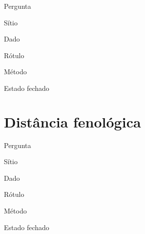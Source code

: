 \begin{ficha}
  \item[Pergunta] \lipsum[12][1]
  \item[Sítio]    \lipsum[13][2]
  \item[Dado]     \lipsum[14][3]
  \item[Rótulo]   \lipsum[15][1]
  \item[Método]   \lipsum[16][2]
  \item[Estado]   fechado
\end{ficha}

\lipsum[17][1-5]

\lipsum[18][1-4]

\conclusao{\lipsum[19][1-2]}

\begin{objecao}\lipsum[20][1-3]\end{objecao}


\section{Distância fenológica}

\begin{ficha}
  \item[Pergunta] \lipsum[21][1]
  \item[Sítio]    \lipsum[22][2]
  \item[Dado]     \lipsum[23][3]
  \item[Rótulo]   \lipsum[24][1]
  \item[Método]   \lipsum[25][2]
  \item[Estado]   fechado
\end{ficha}

\lipsum[26][1-5]

\lipsum[27][1-4]

\conclusao{\lipsum[28][1-2]}

\begin{objecao}\lipsum[29][1-3]\end{objecao}

